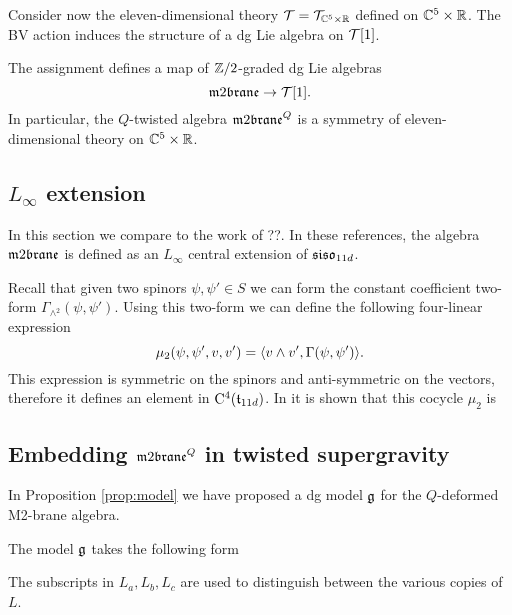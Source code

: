\documentclass[11pt]{amsart}
\begin{document}
Consider now the eleven-dimensional theory $\mathcal T = \mathcal T_{\mathbb C^5 \times \mathbb R}$ defined on $\mathbb C^5 \times \mathbb R$. 
The BV action induces the structure of a dg Lie algebra on $\mathcal T[1]$. 

\begin{prop}
The assignment
 defines a map of $\mathbb Z/2$-graded dg Lie algebras 
\[
\m2 \to \cT[1] .
\]
In particular, the $Q$-twisted algebra $\m2^Q$ is a symmetry of eleven-dimensional theory on $\mathbb C^5 \times \mathbb R$. 
\end{prop}


\subsection{$L_\infty$ extension}

In this section we compare to the work of ??.
In these references, the algebra $\m2$ is defined as an $L_\infty$  
central extension of $\mathfrak{siso}_{11d}$. 

Recall that given two spinors $\psi, \psi' \in S$ we can form the constant coefficient two-form $\Gamma_{\wedge^2} (\psi, \psi')$. 
Using this two-form we can define the following four-linear expression
\[
\mu_2 (\psi, \psi',v,v') = \langle v \wedge v', \Gamma(\psi, \psi')\rangle .
\]
This expression is symmetric on the spinors and anti-symmetric on the vectors, therefore it defines an element in ${\rm C}^4(\mathfrak t_{11d})$. 
In \cite{??} it is shown that this cocycle $\mu_2$ is 

\subsection{Embedding $\m2^Q$ in twisted supergravity} 

In Proposition \ref{prop:model} we have proposed a dg model $\mathfrak g$ for the $Q$-deformed M2-brane algebra. 

The model $\mathfrak g$ takes the following form
\beqn 
{}
\eeqn
The subscripts in $L_a, L_b, L_c$ are used to distinguish between the various copies of $L$.
\end{document}
